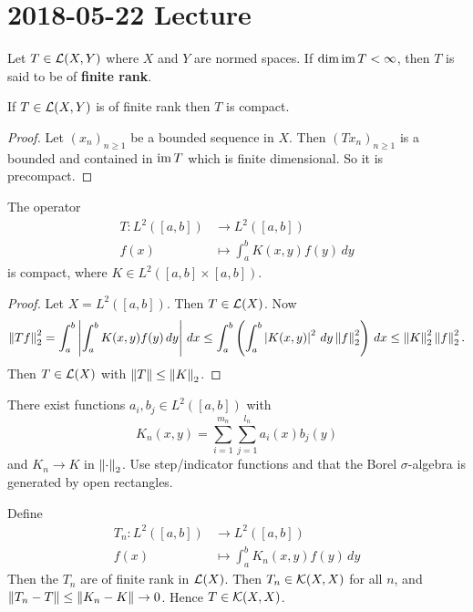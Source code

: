 \section{2018-05-22 Lecture}

\begin{defn}
  Let $T \in \mathcal{L}(X,Y)$ where $X$ and $Y$ are normed spaces.
  If $\dim \operatorname{im} T <\infty$, then $T$ is said to be of \textbf{finite rank}.
\end{defn}

\begin{exer}
  If $T \in \mathcal{L}(X,Y)$ is of finite rank then $T$ is compact.
\end{exer}

\begin{proof}
  Let $(x_n)_{n \geq 1}$ be a bounded sequence in $X$.
  Then $(Tx_n)_{n \geq 1}$ is a bounded and contained in $\operatorname{im} T$ which is finite dimensional.
  So it is precompact.
\end{proof}

\begin{thm}
  The operator
  \begin{align*}
    T: L^2([a,b]) &\to L^2([a,b]) \\
    f(x) &\mapsto \int_a^b K(x,y) f(y) \, dy
  \end{align*}
  is compact, where $K \in L^2([a,b]\times[a,b])$.
\end{thm}

\begin{proof}
  Let $X=L^2([a,b])$.
  Then $T \in \mathcal{L}(X)$.
  Now
  \[ \left\lVert Tf \right\rVert_2^2 = \int_a^b \left\lvert  \int_a^b K(x,y) f(y) \, dy  \right\rvert \, dx \leq \int_a^b \left( \int_a^b \left\lvert K(x,y) \right\rvert^2 \, dy \left\lVert f \right\rVert_2^2 \right) \, dx \leq \left\lVert K \right\rVert_2^2 \left\lVert f \right\rVert_2^2. \]
  Then $T \in \mathcal{L}(X)$ with $\left\lVert T \right\rVert \leq \left\lVert K \right\rVert_2$.
\end{proof}

\begin{exer}
  There exist functions $a_i,b_j \in L^2([a,b])$ with
  \[ K_n(x,y) = \sum_{i=1}^{m_n} \sum_{j=1}^{l_n} a_i(x) b_j(y) \]
  and $K_n \to K$ in $\left\lVert \cdot \right\rVert_2$.
  Use step/indicator functions and that the Borel $\sigma$-algebra is generated by open rectangles.
\end{exer}

Define
\begin{align*}
  T_n: L^2([a,b]) &\to L^2([a,b]) \\
  f(x) &\mapsto \int_a^b K_n(x,y) f(y) \, dy
\end{align*}
Then the $T_n$ are of finite rank in $\mathcal{L}(X)$.
Then $T_n \in \mathcal{K}(X,X)$ for all $n$, and $\left\lVert T_n-T \right\rVert \leq \left\lVert K_n-K \right\rVert \to 0$.
Hence $T \in \mathcal{K}(X,X)$.

